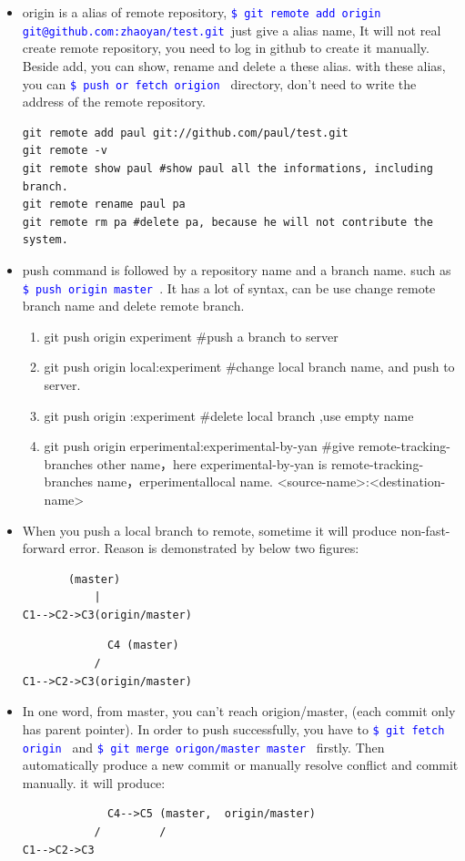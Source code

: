 \documentclass[a4paper,12pt,twoside]{book}
\newcommand{\linuxcommand}[1]{\texttt{\textcolor{blue}{\$ #1 \Pisymbol{psy}{191}}}}
\begin{document}
\begin{itemize}
\begin{itemize}
\begin{itemize}
\item origin is a alias of remote repository,  \linuxcommand{git remote add origin
    git@github.com:zhaoyan/test.git}just give a alias name, It will not real create remote repository, you need to log in github to create it manually.  Beside add, you can show, rename and delete a these alias. with these alias, you can \linuxcommand{push or fetch origion} directory, don't need to write the address of the remote repository.

\begin{verbatim}
git remote add paul git://github.com/paul/test.git
git remote -v
git remote show paul #show paul all the informations, including branch.
git remote rename paul pa
git remote rm pa #delete pa, because he will not contribute the system.
\end{verbatim}

\item push command is followed by a repository name and a branch name.  such as \linuxcommand{push origin master}. It has a lot of syntax, can be use change remote branch name and delete remote branch.
\begin{enumerate}
\item git push origin experiment \#push a branch to server
\item git push origin local:experiment \#change local branch name, and push to server.  \item git push origin :experiment \#delete local branch ,use empty name 
\item git push origin erperimental:experimental-by-yan \#give remote-tracking-branches other name，here experimental-by-yan is remote-tracking-branches name，erperimentallocal name. <source-name>:<destination-name>
\end{enumerate}

\item When you push a local branch to remote, sometime it will produce non-fast-forward error. Reason is
    demonstrated by below two figures:
\begin{verbatim}
       (master)
           |
C1-->C2->C3(origin/master)
\end{verbatim}

\begin{verbatim}
             C4 (master)
           /
C1-->C2->C3(origin/master)
\end{verbatim}
\item In one word, from master, you can't reach origion/master, (each commit only has parent pointer).  In order to
push successfully, you have to \linuxcommand{git fetch origin} and \linuxcommand{git merge origon/master
master} firstly. Then automatically produce a new commit or manually resolve conflict and commit manually. it
will produce:
\begin{verbatim}
             C4-->C5 (master,  origin/master)
           /         /
C1-->C2->C3
\end{verbatim}



\end{itemize}
\end{itemize}
\end{itemize}
\end{document}
